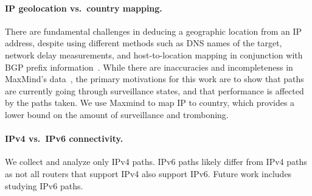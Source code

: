 \paragraph{IP geolocation vs.\ country mapping.}
There are fundamental challenges in deducing a geographic location
from an IP address, 
despite using different methods such as DNS names of the target,
network delay measurements, and host-to-location mapping in
conjunction with BGP prefix
information~\cite{padmanabhan2001investigation}.  While there are
inaccuracies and incompleteness in MaxMind's
data~\cite{huffaker2011geocompare}, the primary motivations for this work are to show that paths 
are currently going through surveillance states, and that performance is affected by the 
paths taken.  We use Maxmind to map IP to
country,
which provides a lower
bound on the amount of surveillance and tromboning.

\paragraph{IPv4 vs.\ IPv6 connectivity.}
We collect and analyze only IPv4 paths.  IPv6 paths likely
differ from IPv4 paths as not all routers that support IPv4 also support
IPv6.  Future work includes studying IPv6 paths.  

